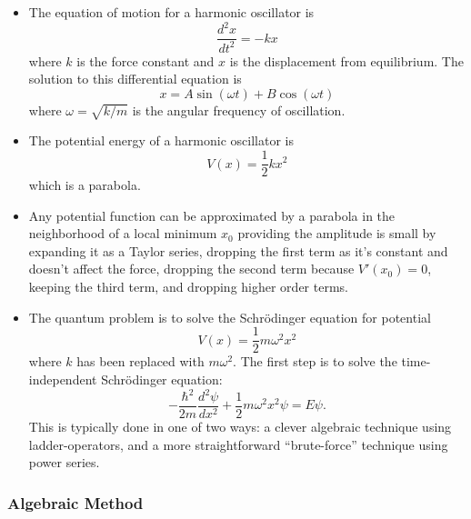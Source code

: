 \documentclass{article}
\begin{document}
\begin{itemize}
  \item The equation of motion for a harmonic oscillator is \[\frac{d^2 x}{d t^2} = -k x\] where $k$ is the force constant and $x$ is the displacement from equilibrium. The solution to this differential equation is \[x = A \sin (\omega t) + B \cos (\omega t)\] where $\omega = \sqrt{k / m}$ is the angular frequency of oscillation.

  \item The potential energy of a harmonic oscillator is \[V(x) = \frac{1}{2} k x^2\] which is a parabola.

  \item Any potential function can be approximated by a parabola in the neighborhood of a local minimum $x_0$ providing the amplitude is small by expanding it as a Taylor series, dropping the first term as it's constant and doesn't affect the force, dropping the second term because $V'(x_0) = 0$, keeping the third term, and dropping higher order terms.

  \item The quantum problem is to solve the Schrödinger equation for potential \[V(x) = \frac{1}{2} m \omega^2 x^2\] where $k$ has been replaced with $m \omega^2$. The first step is to solve the time-independent Schrödinger equation: \[-\frac{\hbar^2}{2 m} \frac{d^2 \psi}{d x^2} + \frac{1}{2} m \omega^2 x^2 \psi = E \psi.\] This is typically done in one of two ways: a clever algebraic technique using ladder-operators, and a more straightforward ``brute-force'' technique using power series.
\end{itemize}

\subsubsection{Algebraic Method}
\end{document}
